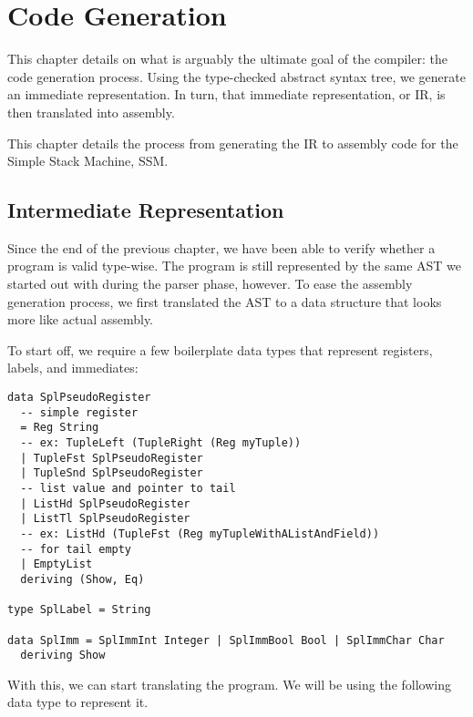 \chapter{Code Generation}

This chapter details on what is arguably the ultimate goal of the compiler: the code generation process.
Using the type-checked abstract syntax tree, we generate an immediate representation.
In turn, that immediate representation, or IR, is then translated into assembly.

This chapter details the process from generating the IR to assembly code for the Simple Stack Machine, SSM.


\section{Intermediate Representation}

Since the end of the previous chapter, we have been able to verify whether a program is valid type-wise.
The program is still represented by the same AST we started out with during the parser phase, however.
To ease the assembly generation process, we first translated the AST to a data structure that looks more like actual assembly.

To start off, we require a few boilerplate data types that represent registers, labels, and immediates:

\begin{verbatim}
data SplPseudoRegister
  -- simple register
  = Reg String
  -- ex: TupleLeft (TupleRight (Reg myTuple))
  | TupleFst SplPseudoRegister
  | TupleSnd SplPseudoRegister
  -- list value and pointer to tail
  | ListHd SplPseudoRegister
  | ListTl SplPseudoRegister
  -- ex: ListHd (TupleFst (Reg myTupleWithAListAndField))
  -- for tail empty
  | EmptyList
  deriving (Show, Eq)

type SplLabel = String

data SplImm = SplImmInt Integer | SplImmBool Bool | SplImmChar Char
  deriving Show
\end{verbatim}

With this, we can start translating the program.
We will be using the following data type to represent it.


